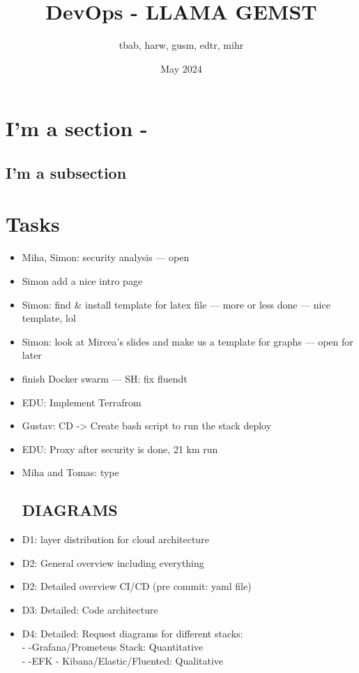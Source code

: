 \documentclass{article}
\title{DevOps - LLAMA GEMST}
\author{tbab, harw, gusm, edtr, mihr}
\date{May 2024}
\begin{document}
\maketitle

\section{I'm a section -}
\subsection{I'm a subsection}

\section{Tasks}

\begin{itemize}
  \item Miha, Simon: security analysis — open
  \item Simon add a nice intro page
  \item Simon: find \& install template for latex file — more or less done — nice template, lol
  \item Simon: look at Mircea's slides and make us a template for graphs — open for later
  \item finish Docker swarm — SH: fix fluendt 
    \item EDU: Implement Terrafrom
    \item Gustav: CD -> Create bash script to run the stack deploy
    \item EDU: Proxy after security is done, 21 km run
   \item Miha and Tomas: type

\subsection{DIAGRAMS}
 
    \item D1: layer distribution for cloud architecture 
    \item D2: General overview including everything 
    \item D2: Detailed overview CI/CD (pre commit: yaml file)
    \item D3: Detailed: Code architecture 
    \item D4: Detailed: Request diagrams for different stacks:
        \\ - -Grafana/Prometeus Stack: Quantitative 
        \\ - -EFK - Kibana/Elastic/Fluented: Qualitative

 \end{itemize}
\end{document}
